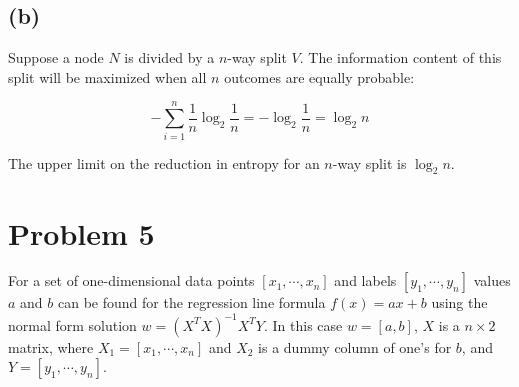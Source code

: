 \documentclass[12pt]{article}
\begin{document}
	\subsection*{(b)}
	Suppose a node $N$ is divided by a $n$-way split $V$. The information content of this split will be maximized when all $n$ outcomes are equally probable:
	
	$$-\sum_{i=1}^n\frac{1}{n}\log_2\frac{1}{n} = -\log_2\frac{1}{n} = \log_2n$$
	
	The upper limit on the reduction in entropy for an $n$-way split is $\log_2n$.

\section*{Problem 5}
For a set of one-dimensional data points $[x_1, \cdots, x_n]$ and labels $[y_1, \cdots , y_n]$ values $a$ and $b$ can be found for the regression line formula $f(x)=ax+b$ using the normal form solution $w = (X^TX)^{-1}X^TY$. In this case $w=[a,b]$, $X$ is a $n \times 2$ matrix, where $X_1=[x_1,\cdots,x_n]$ and $X_2$ is a dummy column of one's for $b$, and $Y=[y_1,\cdots ,y_n]$.
\end{document}
